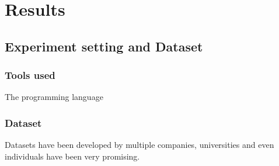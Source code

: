 
\chapter{Results}
\label{chap:Four}

\section{Experiment setting and Dataset}
\label{sec:expset}

\subsection{Tools used}
\label{subsec:tool}

The programming language


\subsection{Dataset}
\label{subsec:data}
Datasets have been developed by multiple companies, universities and even individuals have been very promising. 

